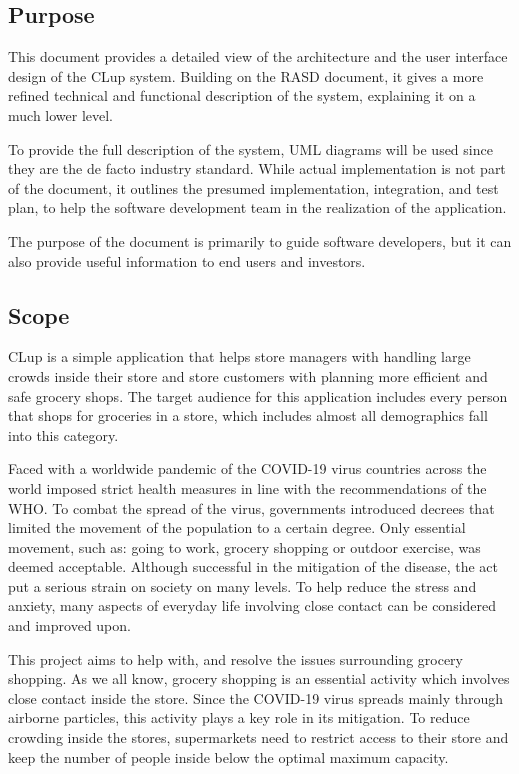 \subsection{Purpose}
\hspace{\parindent}This document provides a detailed view of the architecture and the user interface design of the CLup system. Building on the RASD document, it gives a more refined technical and functional description of the system, explaining it on a much lower level. 

To provide the full description of the system, UML diagrams will be used since they are the de facto industry standard. While actual implementation is not part of the document, it outlines the presumed implementation, integration, and test plan, to help the software development team in the realization of the application.

The purpose of the document is primarily to guide software developers, but it can also provide useful information to end users and investors.  

\newpage

\subsection{Scope}
\hspace{\parindent}CLup is a simple application that helps store managers with handling large crowds inside their store and store customers with planning more efficient and safe grocery shops. The target audience for this application includes every person that shops for groceries in a store, which includes almost all demographics fall into this category. 

Faced with a worldwide pandemic of the COVID-19 virus countries across the world imposed strict health measures in line with the recommendations of the WHO. To combat the spread of the virus, governments introduced decrees that limited the movement of the population to a certain degree. Only essential movement, such as: going to work, grocery shopping or outdoor exercise, was deemed acceptable. Although successful in the mitigation of the disease, the act put a serious strain on society on many levels. To help reduce the stress and anxiety, many aspects of everyday life involving close contact can be considered and improved upon. 

This project aims to help with, and resolve the issues surrounding grocery shopping. As we all know, grocery shopping is an essential activity which involves close contact inside the store. Since the COVID-19 virus spreads mainly through airborne particles, this activity plays a key role in its mitigation. To reduce crowding inside the stores, supermarkets need to restrict access to their store and keep the number of people inside below the optimal maximum capacity. 

